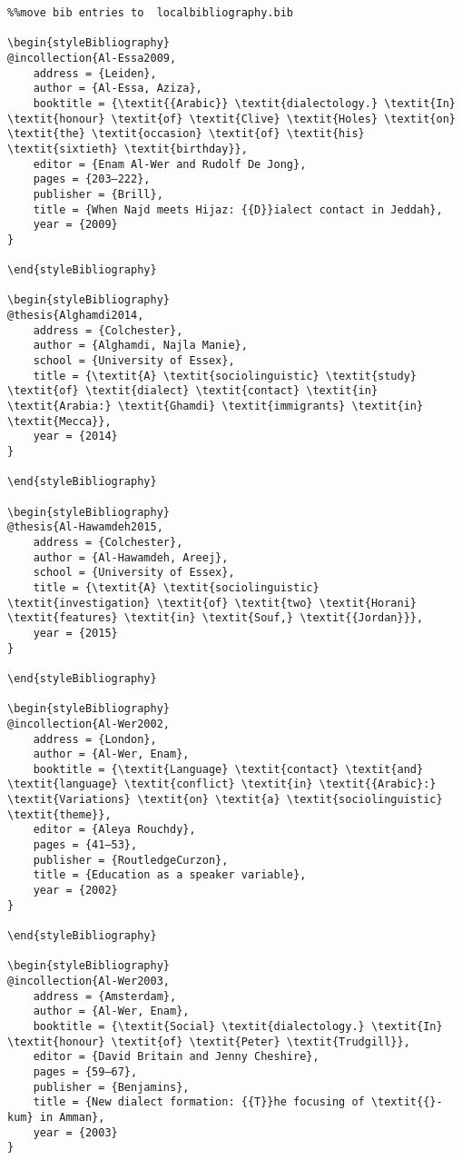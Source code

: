\documentclass[output=paper]{langsci/langscibook}
\begin{document}
\begin{verbatim}%%move bib entries to  localbibliography.bib

\begin{styleBibliography}
@incollection{Al-Essa2009,
	address = {Leiden},
	author = {Al-Essa, Aziza},
	booktitle = {\textit{{Arabic}} \textit{dialectology.} \textit{In} \textit{honour} \textit{of} \textit{Clive} \textit{Holes} \textit{on} \textit{the} \textit{occasion} \textit{of} \textit{his} \textit{sixtieth} \textit{birthday}},
	editor = {Enam Al-Wer and Rudolf De Jong},
	pages = {203–222},
	publisher = {Brill},
	title = {When Najd meets Hijaz: {{D}}ialect contact in Jeddah},
	year = {2009}
}

\end{styleBibliography}

\begin{styleBibliography}
@thesis{Alghamdi2014,
	address = {Colchester},
	author = {Alghamdi, Najla Manie},
	school = {University of Essex},
	title = {\textit{A} \textit{sociolinguistic} \textit{study} \textit{of} \textit{dialect} \textit{contact} \textit{in} \textit{Arabia:} \textit{Ghamdi} \textit{immigrants} \textit{in} \textit{Mecca}},
	year = {2014}
}

\end{styleBibliography}

\begin{styleBibliography}
@thesis{Al-Hawamdeh2015,
	address = {Colchester},
	author = {Al-Hawamdeh, Areej},
	school = {University of Essex},
	title = {\textit{A} \textit{sociolinguistic} \textit{investigation} \textit{of} \textit{two} \textit{Horani} \textit{features} \textit{in} \textit{Souf,} \textit{{Jordan}}},
	year = {2015}
}

\end{styleBibliography}

\begin{styleBibliography}
@incollection{Al-Wer2002,
	address = {London},
	author = {Al-Wer, Enam},
	booktitle = {\textit{Language} \textit{contact} \textit{and} \textit{language} \textit{conflict} \textit{in} \textit{{Arabic}:} \textit{Variations} \textit{on} \textit{a} \textit{sociolinguistic} \textit{theme}},
	editor = {Aleya Rouchdy},
	pages = {41–53},
	publisher = {RoutledgeCurzon},
	title = {Education as a speaker variable},
	year = {2002}
}

\end{styleBibliography}

\begin{styleBibliography}
@incollection{Al-Wer2003,
	address = {Amsterdam},
	author = {Al-Wer, Enam},
	booktitle = {\textit{Social} \textit{dialectology.} \textit{In} \textit{honour} \textit{of} \textit{Peter} \textit{Trudgill}},
	editor = {David Britain and Jenny Cheshire},
	pages = {59–67},
	publisher = {Benjamins},
	title = {New dialect formation: {{T}}he focusing of \textit{{}-kum} in Amman},
	year = {2003}
}


\end{verbatim}
\end{document}

